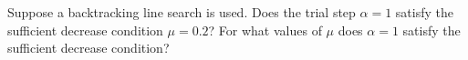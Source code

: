 Suppose a backtracking line search is used. Does the trial step $\alpha = 1$ satisfy the sufficient decrease condition
$\mu = 0.2$? For what values of $\mu$ does $\alpha = 1$ satisfy the sufficient decrease condition?

\begin{solution}
    \ \\
    \vfill
\end{solution}
